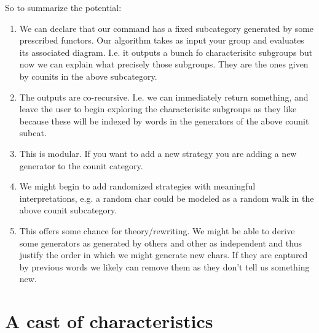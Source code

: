 \documentclass{amsart}
\begin{document}
So to summarize the potential:
\begin{enumerate}
    \item  We can declare that our command has a fixed subcategory generated by
    some prescribed functors. Our algorithm takes as input your group and
    evaluates its associated diagram.  I.e. it outputs a bunch fo characterisitc
    subgroups but now we can explain what precisely those subgroups.  They are
    the ones given by counits in the above subcategory.

    \item The outputs are co-recursive. I.e. we can immediately return
    something, and leave the user to begin exploring the characterisitc
    subgroups as they like because these will be indexed by words in the
    generators of the above counit subcat.

    \item This is modular.  If you want to add a new strategy you are adding a
    new generator to the counit category.  

    \item We might begin to add randomized strategies with meaningful
    interpretations, e.g. a random char could be modeled as a random walk in the
    above counit subcategory.

    \item This offers some chance for theory/rewriting.  We might be able to
    derive some generators as generated by others and other as independent and
    thus justify the order in which we might generate new chars.  If they are
    captured by previous words we likely can remove them as they don't tell us
    something new.

\end{enumerate}


\section{A cast of characteristics}
\end{document}
